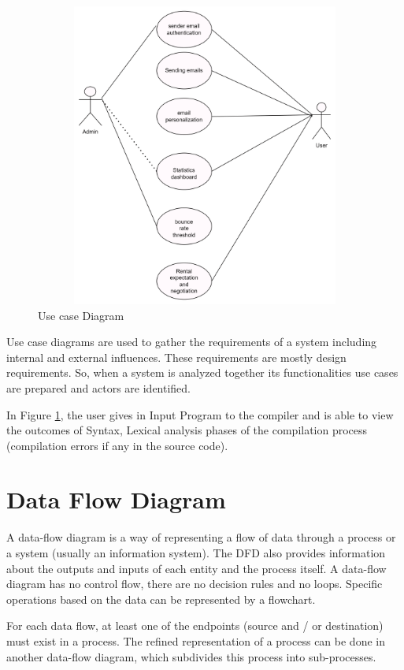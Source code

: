 \begin{figure}[H]
            \centering
            \includegraphics[width=160mm, height=100mm]{figures/use_case.png}
            \caption{Use case Diagram}
            \label{fig:use-case-diagram}
\end{figure}

Use case diagrams are used to gather the requirements of a system including internal and external influences. These requirements are mostly design requirements. So, when a system
is analyzed together its functionalities use cases are prepared and actors are identified. 

In Figure \ref{fig:use-case-diagram}, the user gives in Input Program to the compiler and is able to view the outcomes of Syntax, Lexical analysis phases of the compilation process (compilation errors if any in the source code).

 

\section{Data Flow Diagram}

A data-flow diagram is a way of representing a flow of data through a process or a system (usually an information system). The DFD also provides information about the outputs and inputs of each entity and the process itself. A data-flow diagram has no control flow, there are no decision rules and no loops. Specific operations based on the data can be represented by
a flowchart. 

For each data flow, at least one of the endpoints (source and / or destination) must exist in a process. The refined representation of a process can be done in another data-flow diagram, which subdivides this process into sub-processes.



